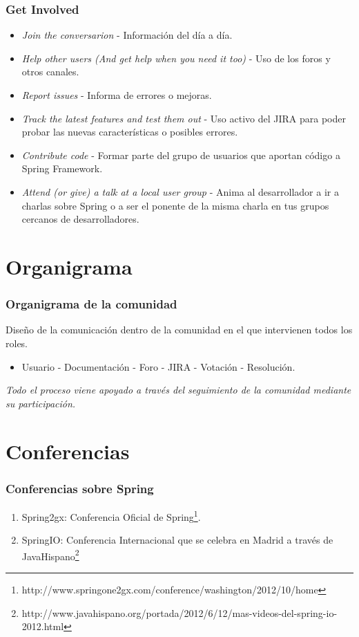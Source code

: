 \documentclass[xcolor=dvipsnames]{beamer}
\begin{document}
\begin{frame}[allowframebreaks]
\frametitle{Get Involved}
\begin{itemize}
    \item \emph{Join the conversarion} - Informaci\'on del d\'ia a d\'ia.
    \item \emph{Help other users (And get help when you need it too)} - Uso de los foros y otros canales.
    \item \emph{Report issues} - Informa de errores o mejoras.
    \item \emph{Track the latest features and test them out} - Uso activo del JIRA para poder probar las nuevas caracter\'isticas o posibles errores.
    \item \emph{Contribute code} - Formar parte del grupo de usuarios que aportan c\'odigo a Spring Framework.
    \item \emph{Attend (or give) a talk at a local user group} - Anima al desarrollador a ir a charlas sobre Spring o a ser el ponente de la misma charla en tus grupos cercanos de desarrolladores.
\end{itemize}
\end{frame}

\section{Organigrama}
\begin{frame}[allowframebreaks]
\frametitle{Organigrama de la comunidad}
Dise\~no de la comunicaci\'on dentro de la comunidad en el que intervienen todos los roles.
\begin{itemize}
    \item Usuario - Documentaci\'on - Foro - JIRA - Votaci\'on - Resoluci\'on.
\end{itemize}
\emph{Todo el proceso viene apoyado a trav\'es del seguimiento de la comunidad mediante su participaci\'on.}
\end{frame}

\section{Conferencias}
\begin{frame}[allowframebreaks]
\frametitle{Conferencias sobre Spring}
\begin{enumerate}
\item Spring2gx: Conferencia Oficial de Spring\footnote{http://www.springone2gx.com/conference/washington/2012/10/home}.
\item SpringIO: Conferencia Internacional que se celebra en Madrid a trav\'es de JavaHispano\footnote{http://www.javahispano.org/portada/2012/6/12/mas-videos-del-spring-io-2012.html}
\end{enumerate}
\end{frame}
\end{document}
